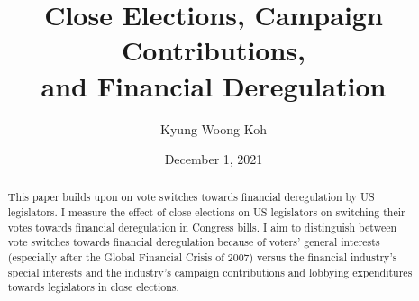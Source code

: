 \documentclass[ProjectKWK]{subfiles}
\begin{document}
\providecommand{\versn}{pdf} %
\ifthenelse{\boolean{Web}}{    %
  \renewcommand{\versn}{Web}     %
  \renewcommand{\rootFromOut}{.} %
}{}  %


\title{Close Elections, Campaign Contributions,\\ and Financial Deregulation}

\author{Kyung Woong Koh\authNum}



\renewcommand{\forcedate}{December 1, 2021}\date{\forcedate}
\maketitle
\hypertarget{abstract}{}
\begin{abstract}
This paper builds upon \cite{IM14} on vote switches towards financial deregulation by US legislators. I measure the effect of close elections on US legislators on switching their votes towards financial deregulation in Congress bills. I aim to distinguish between vote switches towards financial deregulation because of voters' general interests (especially after the Global Financial Crisis of 2007) versus the financial industry's special interests and the industry's campaign contributions and lobbying expenditures towards legislators in close elections.
\end{abstract}


\begin{authorsinfo}
\end{authorsinfo}

\newcommand{\thankstext}{
  The paper is the author's 2nd year paper for fulfillment to the PhD in Economics program at Johns Hopkins University, and also for Professor Christpher Carroll's Computational Methods course. I thank Professors Laurence Ball and Filipe Campante for comments and advice, and Deniz Igan and Prachi Mishra for sharing their data.}
\end{document}
